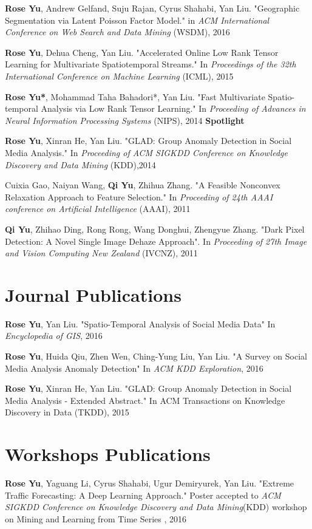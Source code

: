 \documentclass[margin,line]{res}
\begin{document}
\begin{resume}
{\bf Rose Yu}, Andrew Gelfand, Suju Rajan, Cyrus Shahabi, Yan Liu. "Geographic Segmentation via Latent Poisson Factor Model." in \textit{ACM International Conference on Web Search and Data Mining} (WSDM), 2016 

{\bf Rose Yu}, Dehua Cheng, Yan Liu. "Accelerated Online Low Rank Tensor Learning for Multivariate Spatiotemporal Streams." In \textit{Proceedings  of the 32th International Conference on Machine Learning} (ICML), 2015

{\bf Rose Yu*}, Mohammad Taha Bahadori*, Yan Liu. "Fast Multivariate Spatio-temporal Analysis via Low Rank Tensor Learning." In \textit{Proceeding of Advances in Neural Information Processing Systems} (NIPS), 2014 \textbf{Spotlight}

{\bf Rose Yu}, Xinran He, Yan Liu. "GLAD: Group Anomaly Detection in Social Media Analysis." In \textit{Proceeding of ACM SIGKDD Conference on Knowledge Discovery and Data Mining} (KDD),2014

Cuixia Gao, Naiyan Wang, {\bf Qi Yu}, Zhihua Zhang. "A Feasible Nonconvex Relaxation Approach to Feature Selection." In \textit{Proceeding of 24th AAAI conference on Artificial Intelligence} (AAAI), 2011 

{\bf Qi Yu}, Zhihao Ding, Rong Rong, Wang Donghui, Zhengyue Zhang. "Dark Pixel Detection: A Novel Single Image Dehaze Approach". In \textit{Proceeding of 27th Image and Vision Computing New Zealand }(IVCNZ), 2011  

 
\section{\sc Journal Publications}
{\bf Rose Yu},  Yan Liu.  "Spatio-Temporal Analysis of Social Media Data"  In \textit{Encyclopedia of GIS}, 2016

{\bf Rose Yu}, Huida Qiu, Zhen Wen, Ching-Yung Liu,  Yan Liu. "A Survey on Social Media Analysis  Anomaly Detection" In \textit{ACM KDD Exploration},  2016

{\bf Rose Yu}, Xinran He, Yan Liu. "GLAD: Group Anomaly Detection in Social Media Analysis - Extended Abstract." In \textit{}ACM Transactions on Knowledge Discovery in Data  (TKDD), 2015


\section{\sc Workshops Publications}


{\bf Rose Yu}, Yaguang Li, Cyrus Shahabi, Ugur Demiryurek, Yan Liu. "Extreme Traffic Forecasting: A Deep Learning Approach." Poster accepted to \textit{ACM SIGKDD Conference on Knowledge Discovery and Data Mining}(KDD)  workshop on Mining and Learning from Time Series , 2016



\end{resume}
\end{document}
